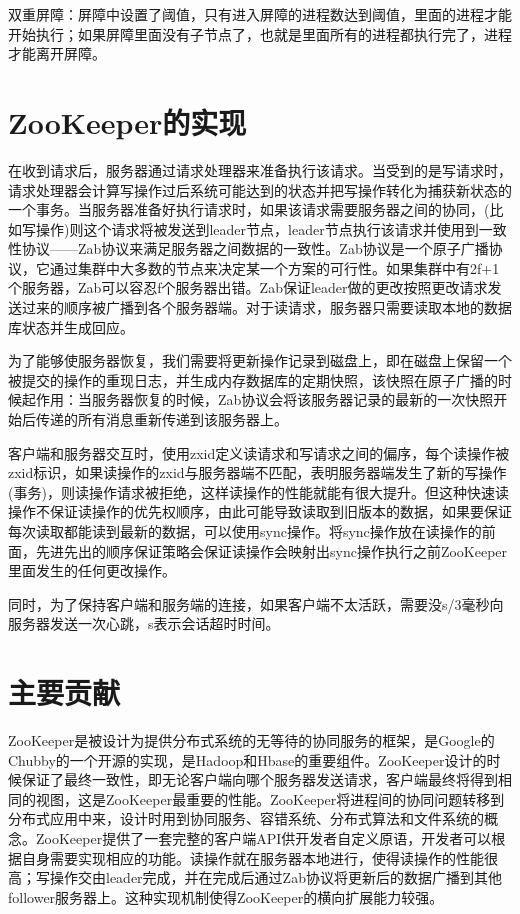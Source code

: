 \documentclass[UTF8]{article}
\begin{document}
双重屏障：屏障中设置了阈值，只有进入屏障的进程数达到阈值，里面的进程才能开始执行；如果屏障里面没有子节点了，也就是里面所有的进程都执行完了，进程才能离开屏障。

\section{ZooKeeper的实现}
在收到请求后，服务器通过请求处理器来准备执行该请求。当受到的是写请求时，请求处理器会计算写操作过后系统可能达到的状态并把写操作转化为捕获新状态的一个事务。当服务器准备好执行请求时，如果该请求需要服务器之间的协同，(比如写操作)则这个请求将被发送到leader节点，leader节点执行该请求并使用到一致性协议——Zab协议来满足服务器之间数据的一致性。Zab协议是一个原子广播协议，它通过集群中大多数的节点来决定某一个方案的可行性。如果集群中有2f+1个服务器，Zab可以容忍f个服务器出错。Zab保证leader做的更改按照更改请求发送过来的顺序被广播到各个服务器端。对于读请求，服务器只需要读取本地的数据库状态并生成回应。

为了能够使服务器恢复，我们需要将更新操作记录到磁盘上，即在磁盘上保留一个被提交的操作的重现日志，并生成内存数据库的定期快照，该快照在原子广播的时候起作用：当服务器恢复的时候，Zab协议会将该服务器记录的最新的一次快照开始后传递的所有消息重新传递到该服务器上。

客户端和服务器交互时，使用zxid定义读请求和写请求之间的偏序，每个读操作被zxid标识，如果读操作的zxid与服务器端不匹配，表明服务器端发生了新的写操作(事务)，则读操作请求被拒绝，这样读操作的性能就能有很大提升。但这种快速读操作不保证读操作的优先权顺序，由此可能导致读取到旧版本的数据，如果要保证每次读取都能读到最新的数据，可以使用sync操作。将sync操作放在读操作的前面，先进先出的顺序保证策略会保证读操作会映射出sync操作执行之前ZooKeeper里面发生的任何更改操作。

同时，为了保持客户端和服务端的连接，如果客户端不太活跃，需要没s/3毫秒向服务器发送一次心跳，s表示会话超时时间。

\section{主要贡献}
ZooKeeper是被设计为提供分布式系统的无等待的协同服务的框架，是Google的Chubby的一个开源的实现，是Hadoop和Hbase的重要组件。ZooKeeper设计的时候保证了最终一致性，即无论客户端向哪个服务器发送请求，客户端最终将得到相同的视图，这是ZooKeeper最重要的性能。ZooKeeper将进程间的协同问题转移到分布式应用中来，设计时用到协同服务、容错系统、分布式算法和文件系统的概念。ZooKeeper提供了一套完整的客户端API供开发者自定义原语，开发者可以根据自身需要实现相应的功能。读操作就在服务器本地进行，使得读操作的性能很高；写操作交由leader完成，并在完成后通过Zab协议将更新后的数据广播到其他follower服务器上。这种实现机制使得ZooKeeper的横向扩展能力较强。
\end{document}
